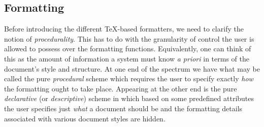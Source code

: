 \subsection{Formatting}
Before introducing the different {\TeX}-based formatters, we need to
clarify the notion of {\it procedurality\/}.
This has to do with the granularity
of control the user is allowed to possess over the formatting functions.
Equivalently, one can think of this as the amount of information a system
must know {\it a priori\/} in terms of the document's style and structure.
At one end of the spectrum we have what may be called the
pure {\it procedural\/} scheme which requires the user to specify exactly
{\it how\/} the formatting ought to take place.
Appearing at the other end is the pure
{\it declarative\/} (or {\it descriptive\/}) scheme
in which based on some predefined attributes
the user specifies just {\it what\/} a document should be and
the formatting details associated with various document styles
are hidden.


